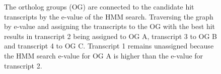 \begin{figure}[t]
	\def\svgwidth{0.8\textwidth}
	
	\caption[Non-redundant assignment]{The ortholog groups (OG) are connected to
		the candidate hit transcripts by the e-value of the HMM search. Traversing
		the graph by e-value and assigning the transcripts to the OG with the best
		hit results in transcript 2 being assigned to OG A, transcript 3 to OG B and
		transcript 4 to OG C. Transcript 1 remains unassigned because the HMM search
		e-value for OG A is higher than the e-value for transcript 2.}
	\label{fig:orthograph-graph}
\end{figure}

